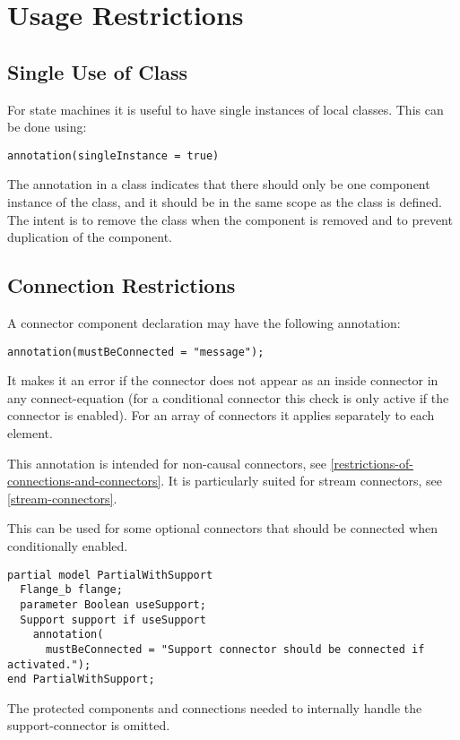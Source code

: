 \section{Usage Restrictions}\label{usage-restrictions}
\subsection{Single Use of Class}\label{annotation-for-single-use-of-class}\label{single-use-of-class}

For state machines it is useful to have single instances of local classes.
This can be done using:
\begin{lstlisting}[language=modelica]
annotation(singleInstance = true)
\end{lstlisting}

The annotation  in a class indicates that there should only be one component instance of the class, and it should be in the same scope as the class is defined.
The intent is to remove the class when the component is removed and to prevent duplication of the component.

\subsection{Connection Restrictions}\label{connection-restrictions}

A connector component declaration may have the following annotation:
\begin{lstlisting}[language=modelica]
annotation(mustBeConnected = "message");
\end{lstlisting}%

It makes it an error if the connector does not appear as an inside connector in any connect-equation (for a conditional connector this check is only active if the connector is enabled).
For an array of connectors it applies separately to each element.

\begin{nonnormative}
This annotation is intended for non-causal connectors, see \cref{restrictions-of-connections-and-connectors}.
It is particularly suited for stream connectors, see \cref{stream-connectors}.
\end{nonnormative}

\begin{example}
This can be used for some optional connectors that should be connected when conditionally enabled.
\begin{lstlisting}[language=modelica]
partial model PartialWithSupport
  Flange_b flange;
  parameter Boolean useSupport;
  Support support if useSupport
    annotation(
      mustBeConnected = "Support connector should be connected if activated.");
end PartialWithSupport;
\end{lstlisting}
The protected components and connections needed to internally handle the support-connector is omitted.
\end{example}

